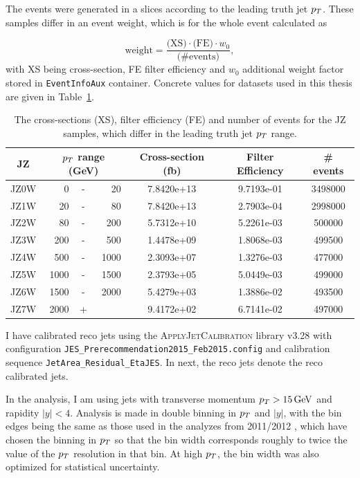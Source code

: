 The events were generated in a slices according to the leading truth jet $p_{T}$. These
samples differ in an event weight, which is for the whole event calculated as 

\begin{equation}
  \text{weight} = \frac{\text{(XS)} \cdot \text{(FE)} \cdot w_0}{\text{(\# events)}},
\end{equation}
with XS being cross-section, FE filter efficiency and $w_0$ additional weight
factor stored in \texttt{EventInfoAux} container. Concrete values for datasets used in
this thesis are given in Table~\ref{tab:JZXW}.  

\begin{table}
  \centering
  \begin{tabular}{|c|rcr|c|c|c|}
    \hline 
     JZ & \multicolumn{3}{|c|}{$p_{T}$ range (GeV)} & Cross-section (fb) & Filter Efficiency & \# events  \\ 
    \hline
    \hline
		 JZ0W &     0 & - &    20 & 7.8420e+13 & 9.7193e-01 & 3498000 \\ 
    \hline
		 JZ1W &    20 & - &    80 & 7.8420e+13 & 2.7903e-04 & 2998000 \\
    \hline
		 JZ2W &    80 & - &   200 & 5.7312e+10 & 5.2261e-03 & 500000  \\
    \hline
		 JZ3W &   200 & - &   500 & 1.4478e+09 & 1.8068e-03 & 499500  \\
    \hline
		 JZ4W &   500 & - &  1000 & 2.3093e+07 & 1.3276e-03 & 477000  \\
    \hline
		 JZ5W &  1000 & - &  1500 & 2.3793e+05 & 5.0449e-03 & 499000  \\
    \hline
		 JZ6W &  1500 & - &  2000 & 5.4279e+03 & 1.3886e-02 & 493500  \\
    \hline
		 JZ7W &  2000 & + &       & 9.4172e+02 & 6.7141e-02 & 497000  \\
    \hline 
  \end{tabular}
  \caption{The cross-sections (XS), filter efficiency (FE) and number of events
  for the JZ samples, which differ in the leading truth jet $p_{T}$ range.}
  \label{tab:JZXW}
\end{table}

I have calibrated reco jets using the \textsc{ApplyJetCalibration}
\cite{ApplyJetCalibration} library v3.28 with configuration 
\texttt{JES\_Prerecommendation2015\_Feb2015.config} and
calibration sequence \texttt{JetArea\_Residual\_EtaJES}. In next, the reco jets
denote the reco calibrated jets.

In the analysis, I am using jets with transverse momentum $p_{T}>15\,\text{GeV}$ and
rapidity $|y|<4$. Analysis is made in double binning in $p_{T}$ and $|y|$, with
the bin edges being the same as those used in the analyzes from 2011/2012 \cite{Analysis2012},
which have chosen the binning in $p_{T}$ so that the bin width corresponds roughly
to twice the value of the $p_{T}$ resolution in that bin. At high $p_{T}$, the bin
width was also optimized for statistical uncertainty.

